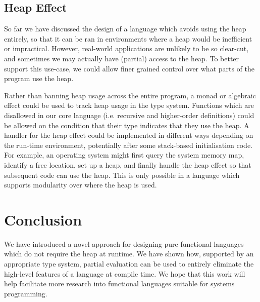 \documentclass[runningheads]{llncs}
\begin{document}


\subsection{Heap Effect}

So far we have discussed the design of a language which avoids using the heap entirely, so that it can be ran in environments where a heap would be inefficient or impractical. However, real-world applications are unlikely to be so clear-cut, and sometimes we may actually have (partial) access to the heap. To better support this use-case, we could allow finer grained control over what parts of the program use the heap.

Rather than banning heap usage across the entire program, a monad or algebraic effect \cite{karachalias2021efficient} could be used to track heap usage in the type system. Functions which are disallowed in our core language (i.e. recursive and higher-order definitions) could be allowed on the condition that their type indicates that they use the heap. A handler for the heap effect could be implemented in different ways depending on the run-time environment, potentially after some stack-based initialisation code. For example, an operating system might first query the system memory map, identify a free location, set up a heap, and finally handle the heap effect so that subsequent code can use the heap. This is only possible in a language which supports modularity over where the heap is used.

\section{Conclusion}

We have introduced a novel approach for designing pure functional languages which do not require the heap at runtime. We have shown how, supported by an appropriate type system, partial evaluation can be used to entirely eliminate the high-level features of a language at compile time. We hope that this work will help facilitate more research into functional languages suitable for systems programming.
\end{document}
